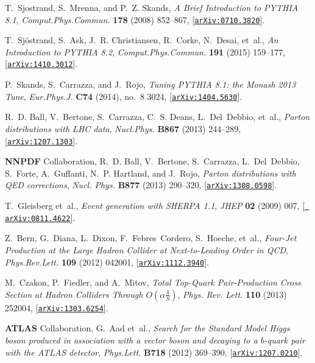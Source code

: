 \documentclass[a4paper,11pt]{article}
\begin{document}
\begin{thebibliography}{100}
T.~Sjostrand, S.~Mrenna, and P.~Z. Skands, {\it {A Brief Introduction to PYTHIA
  8.1}},  {\em Comput.Phys.Commun.} {\bf 178} (2008) 852--867,
  [\href{http://arxiv.org/abs/0710.3820}{{\tt arXiv:0710.3820}}].

T.~Sjöstrand, S.~Ask, J.~R. Christiansen, R.~Corke, N.~Desai, et~al., {\it {An
  Introduction to PYTHIA 8.2}},  {\em Comput.Phys.Commun.} {\bf 191} (2015)
  159--177, [\href{http://arxiv.org/abs/1410.3012}{{\tt arXiv:1410.3012}}].

P.~Skands, S.~Carrazza, and J.~Rojo, {\it {Tuning PYTHIA 8.1: the Monash 2013
  Tune}},  {\em Eur.Phys.J.} {\bf C74} (2014), no.~8 3024,
  [\href{http://arxiv.org/abs/1404.5630}{{\tt arXiv:1404.5630}}].

R.~D. Ball, V.~Bertone, S.~Carrazza, C.~S. Deans, L.~Del~Debbio, et~al., {\it
  {Parton distributions with LHC data}},  {\em Nucl.Phys.} {\bf B867} (2013)
  244--289, [\href{http://arxiv.org/abs/1207.1303}{{\tt arXiv:1207.1303}}].

{\bf NNPDF} Collaboration, R.~D. Ball, V.~Bertone, S.~Carrazza, L.~Del~Debbio,
  S.~Forte, A.~Guffanti, N.~P. Hartland, and J.~Rojo, {\it {Parton
  distributions with QED corrections}},  {\em Nucl. Phys.} {\bf B877} (2013)
  290--320, [\href{http://arxiv.org/abs/1308.0598}{{\tt arXiv:1308.0598}}].

T.~Gleisberg et~al., {\it {Event generation with SHERPA 1.1}},  {\em JHEP} {\bf
  02} (2009) 007, [\href{http://arxiv.org/abs/0811.4622}{{\tt
  arXiv:0811.4622}}].

Z.~Bern, G.~Diana, L.~Dixon, F.~Febres~Cordero, S.~Hoeche, et~al., {\it
  {Four-Jet Production at the Large Hadron Collider at Next-to-Leading Order in
  QCD}},  {\em Phys.Rev.Lett.} {\bf 109} (2012) 042001,
  [\href{http://arxiv.org/abs/1112.3940}{{\tt arXiv:1112.3940}}].

M.~Czakon, P.~Fiedler, and A.~Mitov, {\it {Total Top-Quark Pair-Production
  Cross Section at Hadron Colliders Through $O(α\frac{4}{S})$}},  {\em Phys.
  Rev. Lett.} {\bf 110} (2013) 252004,
  [\href{http://arxiv.org/abs/1303.6254}{{\tt arXiv:1303.6254}}].

{\bf ATLAS} Collaboration, G.~Aad et~al., {\it {Search for the Standard Model
  Higgs boson produced in association with a vector boson and decaying to a
  $b$-quark pair with the ATLAS detector}},  {\em Phys.Lett.} {\bf B718} (2012)
  369--390, [\href{http://arxiv.org/abs/1207.0210}{{\tt arXiv:1207.0210}}].



\end{thebibliography}
\end{document}
